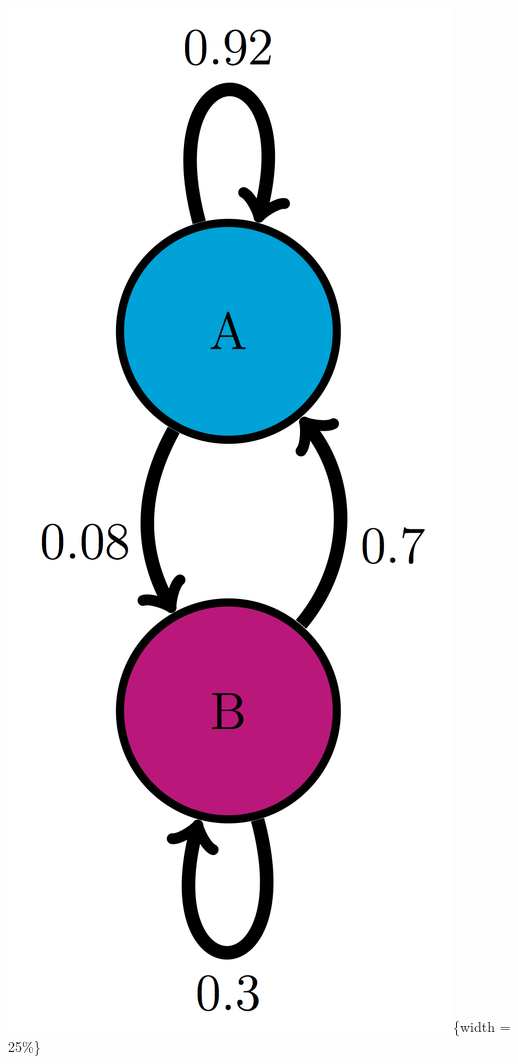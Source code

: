 \documentclass[
]{book}
\theoremstyle{definition}
\theoremstyle{definition}
\theoremstyle{definition}
\theoremstyle{remark}
\begin{document}
\includegraphics{ch10/AB_trans_diag.png}\{width = 25\%\}
\end{document}

